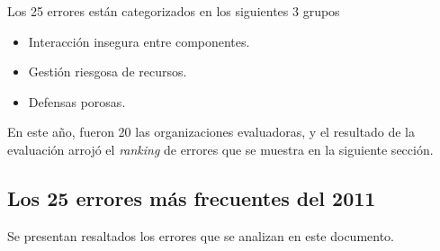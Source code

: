 \documentclass[a4paper,10pt]{article}
\begin{document}
Los 25 errores están categorizados en los siguientes 3 grupos
\begin{itemize}
    \item Interacción insegura entre componentes.
    \item Gestión riesgosa de recursos.
    \item Defensas porosas.
\end{itemize}

En este año, fueron 20 las organizaciones evaluadoras, y el resultado de la evaluación arrojó el \emph{ranking} de errores que se muestra
en la siguiente sección.

\subsection{Los 25 errores más frecuentes del 2011}
Se presentan resaltados los errores que se analizan en este documento.
\end{document}
